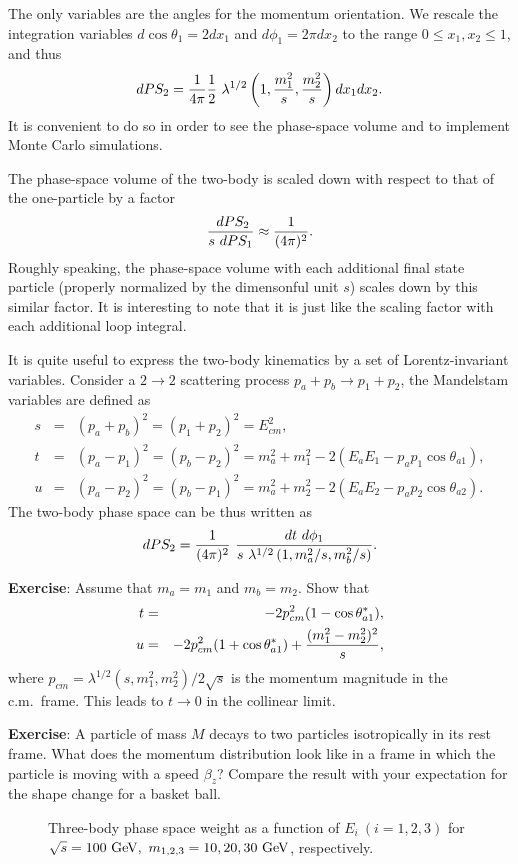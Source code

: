 \documentclass[12pt,prd,aps,floats,preprintnumbers,preprint,superscriptaddress,floatfix,nofootinbib]{revtex4}
\def\gev{{\rm GeV}}
\def\be{\begin{equation}}
\def\ee{\end{equation}}
\def\bea{\begin{eqnarray}}
\def\eea{\end{eqnarray}}
\begin{document}
The only variables are the angles for the momentum orientation.
We  rescale the integration variables $d\cos\theta_1=2dx_1$
and $d\phi_1=2\pi dx_2$ to the range $0\le x_1, x_2 \le 1$, and thus
\bea
dPS_2  = {1\over 4\pi}{1\over 2}\ 
\lambda^{1/2}\left(1,{m_1^2\over s},{m_2^2\over s}\right) 
dx_1 dx_2.
\eea
It is convenient to do so in order 
to see the phase-space volume and to implement Monte Carlo simulations.

The phase-space volume of the two-body is scaled down 
with respect to that of the one-particle by a factor 
\be
{ \ dPS_2\over s\ dPS_1} \approx {1\over (4\pi)^2} .
\ee
Roughly speaking, the phase-space volume with each additional
final state particle (properly normalized by the dimensonful
unit $s$) scales down by this similar factor. It is interesting
to note that it is just like the scaling factor with each
additional loop integral.

It is quite useful to express the two-body kinematics by a set
of Lorentz-invariant variables.
Consider a $2\to 2$ scattering process $p_a + p_b\to p_1 + p_2$, 
the Mandelstam variables are defined as
\bea
\nonumber
s&=&(p_a+p_b)^2=(p_1+p_2)^2=E^2_{cm},\\
t&=&(p_a-p_1)^2=(p_b-p_2)^2=m_a^2+m_1^2-2(E_a E_1-p_ap_1\cos\theta_{a1}) ,\\
\nonumber
u&=&(p_a-p_2)^2=(p_b-p_1)^2=m_a^2+m_2^2-2(E_a E_2-p_ap_2\cos\theta_{a2}).
\eea
The two-body phase space can be thus written as
\be
dPS_2 = {1\over (4\pi)^2}\ 
{dt\ d\phi_1
\over s\ \lambda^{1/2}\left(1,{m_a^2/s},{m_b^2/ s}\right)}.
\ee

\noindent
{{\bf Exercise}: Assume that $m_a=m_1$ and  $m_b=m_2$. Show that 
\bea
\nonumber
t&=& -2 p_{cm}^2 (1- \cos\theta^*_{a1}) ,\\
\nonumber
u&=& -2 p_{cm}^2 (1+ \cos\theta^*_{a1}) + {(m_1^2-m_2^2)^2\over s},
\eea
where $p_{cm}=\lambda^{1/2}(s,m_1^2,m_2^2)/2\sqrt s$ is the momentum 
magnitude in the\\
 c.m.~frame.  This leads to $t\to 0$ in the collinear limit.}

\vskip 0.3cm
\noindent
{{\bf Exercise}: A particle of mass $M$ decays to two particles 
isotropically in its rest frame. What does the momentum distribution look
like in a frame in which the particle is moving with a speed $\beta_z$?
Compare the result with your expectation for the shape change for a
basket ball.
}

\begin{center}
\begin{figure}[tb]
\caption{Three-body phase space weight as a function of $E_i\ (i=1,2,3)$
for $\sqrt s=100\ \gev,\ m_{1,2,3}=10,20,30\ \gev$, respectively.
\label{3body}}
\end{figure}
\end{center}
\end{document}
